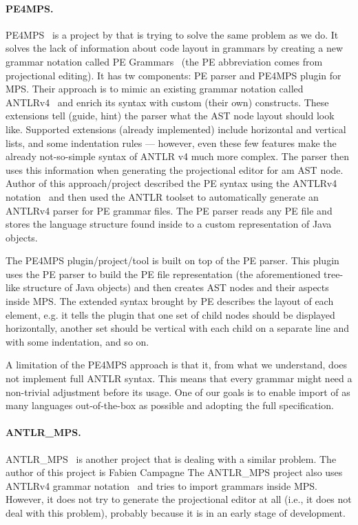 \paragraph{PE4MPS.}
PE4MPS~\cite{ref:PE4MPS} is a project by  that is trying to solve the same problem as we do.
It solves the lack of information about code layout in grammars by creating a new grammar notation called PE Grammars~\cite{ref:PE} (the PE abbreviation comes from projectional editing).
It has tw components: PE parser and PE4MPS plugin for MPS.
Their approach is to mimic an existing grammar notation called ANTLRv4~\cite{ANTLR4} and enrich its syntax with custom (their own) constructs.
These extensions tell (guide, hint) the parser what the AST node layout should look like.
Supported extensions (already implemented) include horizontal and vertical lists, and some indentation rules --- however, even these few features make the already not-so-simple syntax of ANTLR v4 much more complex.
The parser then uses this information when generating the projectional editor for am AST node.
Author of this approach/project described the PE syntax using the ANTLRv4 notation~\cite{ANTLR4reference} and then used the ANTLR toolset to automatically generate an ANTLRv4 parser for PE grammar files.
The PE parser reads any PE file and stores the language structure found inside to a custom representation of Java objects.

The PE4MPS plugin/project/tool is built on top of the PE parser.
This plugin uses the PE parser to build the PE file representation (the aforementioned tree-like structure of Java objects) and then creates AST nodes and their aspects inside MPS.
The extended syntax brought by PE describes the layout of each element, e.g. it tells the plugin that one set of child nodes should be displayed horizontally, another set should be vertical with each child on a separate line and with some indentation, and so on.

A limitation of the PE4MPS approach is that it, from what we understand, does not implement full ANTLR syntax.
This means that every grammar might need a non-trivial adjustment before its usage.
One of our goals is to enable import of as many languages out-of-the-box as possible and adopting the full specification.

\paragraph{ANTLR{\_}MPS.}
ANTLR{\_}MPS~\cite{ANTLR2MPS} is another project that is dealing with a similar problem.
The author of this project is Fabien Campagne
The ANTLR{\_}MPS project also uses ANTLRv4 grammar notation~\cite{ANTLR4} and tries to import grammars inside MPS.
However, it does not try to generate the projectional editor at all (i.e., it does not deal with this problem), probably because it is in an early stage of development.

